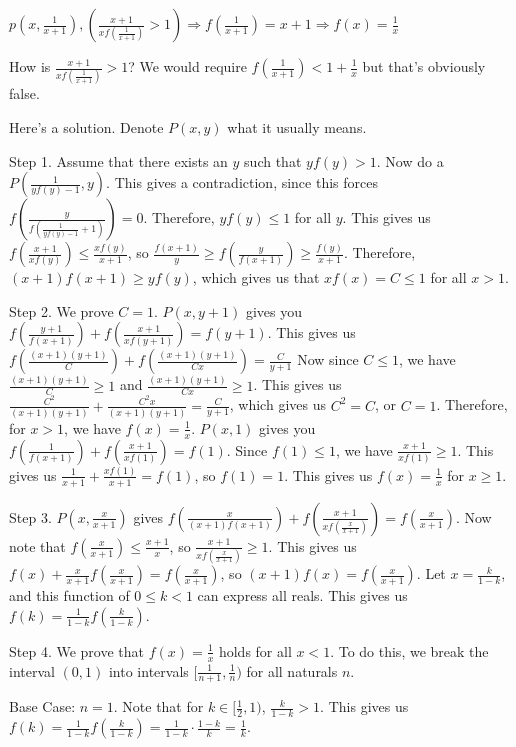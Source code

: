 \begin{solution}
	\begin{tcolorbox}
$p(x,\frac{1}{x+1}),(\frac{x+1}{xf(\frac{1}{x+1})}> 1)\Rightarrow f(\frac{1}{x+1})=x+1\Rightarrow f(x)=\frac{1}{x}$\end{tcolorbox}
How is $\frac{x+1}{xf(\frac{1}{x+1})} > 1$? We would require $f(\frac{1}{x+1}) < 1+\frac{1}{x}$ but that's obviously false.

Here's a solution. Denote $P(x,y)$ what it usually means.

Step 1. 
Assume that there exists an $y$ such that $yf(y)>1$. 
Now do a $P(\frac{1}{yf(y)-1},y)$. This gives a contradiction, since this forces $f(\frac{y}{f(\frac{1}{yf(y)-1}+1)}) = 0$.
Therefore, $yf(y) \le 1$ for all $y$.
This gives us $f(\frac{x+1}{xf(y)}) \le \frac{xf(y)}{x+1}$, so $\frac{f(x+1)}{y} \ge f(\frac{y}{f(x+1)}) \ge \frac{f(y)}{x+1}$.
Therefore, $(x+1)f(x+1) \ge yf(y)$, which gives us that $xf(x)=C \le 1$ for all $x>1$.

Step 2. 
We prove $C=1$. $P(x,y+1)$ gives you $f(\frac{y+1}{f(x+1)}) + f(\frac{x+1}{xf(y+1)}) = f(y+1)$.
This gives us $f(\frac{(x+1)(y+1)}{C}) + f(\frac{(x+1)(y+1)}{Cx}) = \frac{C}{y+1}$
Now since $C \le 1$, we have $\frac{(x+1)(y+1)}{C} \ge 1$ and $\frac{(x+1)(y+1)}{Cx} \ge 1$.
This gives us $\frac{C^2}{(x+1)(y+1)} + \frac{C^2x}{(x+1)(y+1)} = \frac{C}{y+1}$, which gives us $C^2=C$, or $C=1$.
Therefore, for $x>1$, we have $f(x)=\frac{1}{x}$.
$P(x,1)$ gives you $f(\frac{1}{f(x+1)})+f(\frac{x+1}{xf(1)})=f(1)$.
Since $f(1) \le 1$, we have $\frac{x+1}{xf(1)} \ge 1$.
This gives us $\frac{1}{x+1} + \frac{xf(1)}{x+1} = f(1)$, so $f(1)=1$. This gives us $f(x)=\frac{1}{x}$ for $x \ge 1$.

Step 3. 
$P(x,\frac{x}{x+1})$ gives $f(\frac{x}{(x+1)f(x+1)}) + f(\frac{x+1}{xf(\frac{x}{x+1})}) = f(\frac{x}{x+1})$.
Now note that $f(\frac{x}{x+1}) \le \frac{x+1}{x}$, so $\frac{x+1}{xf(\frac{x}{x+1})} \ge 1$. 
This gives us $f(x)+\frac{x}{x+1}f(\frac{x}{x+1}) = f(\frac{x}{x+1})$, so $(x+1)f(x)=f(\frac{x}{x+1})$.
Let $x=\frac{k}{1-k}$, and this function of $0 \le k <1$ can express all reals.
This gives us $f(k)=\frac{1}{1-k}f(\frac{k}{1-k})$. 

Step 4. 
We prove that $f(x)=\frac{1}{x}$ holds for all $x<1$. 
To do this, we break the interval $(0,1)$ into intervals $[\frac{1}{n+1},\frac{1}{n})$ for all naturals $n$.

Base Case: $n=1$. Note that for $k \in [\frac{1}{2},1)$, $\frac{k}{1-k} > 1$.
This gives us $f(k)=\frac{1}{1-k}f(\frac{k}{1-k}) = \frac{1}{1-k} \cdot \frac{1-k}{k} = \frac{1}{k}$.


\end{solution}
